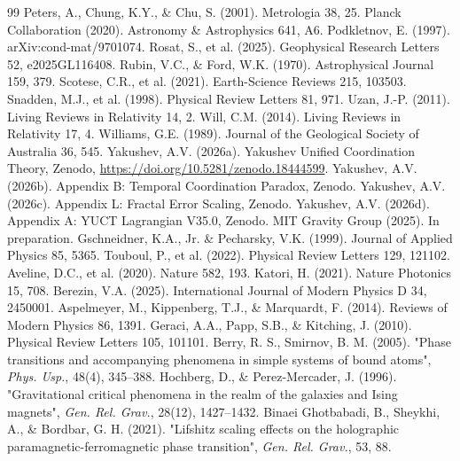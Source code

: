 \documentclass[12pt]{article}
\theoremstyle{remark}
\begin{document}
\begin{thebibliography}{99}
		 Peters, A., Chung, K.Y., \& Chu, S. (2001). Metrologia 38, 25.
		 Planck Collaboration (2020). Astronomy \& Astrophysics 641, A6.
		 Podkletnov, E. (1997). arXiv:cond-mat/9701074.
		 Rosat, S., et al. (2025). Geophysical Research Letters 52, e2025GL116408.
		 Rubin, V.C., \& Ford, W.K. (1970). Astrophysical Journal 159, 379.
		 Scotese, C.R., et al. (2021). Earth-Science Reviews 215, 103503.
		 Snadden, M.J., et al. (1998). Physical Review Letters 81, 971.
		 Uzan, J.-P. (2011). Living Reviews in Relativity 14, 2.
		 Will, C.M. (2014). Living Reviews in Relativity 17, 4.
		 Williams, G.E. (1989). Journal of the Geological Society of Australia 36, 545.
		 Yakushev, A.V. (2026a). Yakushev Unified Coordination Theory, Zenodo, \url{https://doi.org/10.5281/zenodo.18444599}.
		 Yakushev, A.V. (2026b). Appendix B: Temporal Coordination Paradox, Zenodo.
		 Yakushev, A.V. (2026c). Appendix L: Fractal Error Scaling, Zenodo.
		 Yakushev, A.V. (2026d). Appendix A: YUCT Lagrangian V35.0, Zenodo.
		 MIT Gravity Group (2025). In preparation.
		 Gschneidner, K.A., Jr. \& Pecharsky, V.K. (1999). Journal of Applied Physics 85, 5365.
		 Touboul, P., et al. (2022). Physical Review Letters 129, 121102.
		 Aveline, D.C., et al. (2020). Nature 582, 193.
		 Katori, H. (2021). Nature Photonics 15, 708.
		 Berezin, V.A. (2025). International Journal of Modern Physics D 34, 2450001.
		 Aspelmeyer, M., Kippenberg, T.J., \& Marquardt, F. (2014). Reviews of Modern Physics 86, 1391.
		 Geraci, A.A., Papp, S.B., \& Kitching, J. (2010). Physical Review Letters 105, 101101.
		 Berry, R. S., Smirnov, B. M. (2005). "Phase transitions and accompanying phenomena in simple systems of bound atoms", \textit{Phys. Usp.}, 48(4), 345–388.
		 Hochberg, D., \& Perez-Mercader, J. (1996). "Gravitational critical phenomena in the realm of the galaxies and Ising magnets", \textit{Gen. Rel. Grav.}, 28(12), 1427–1432.
		 Binaei Ghotbabadi, B., Sheykhi, A., \& Bordbar, G. H. (2021). "Lifshitz scaling effects on the holographic paramagnetic-ferromagnetic phase transition", \textit{Gen. Rel. Grav.}, 53, 88.

\end{thebibliography}
\end{document}

